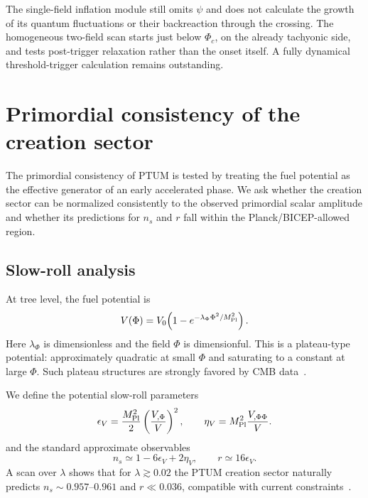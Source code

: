 \documentclass[epj]{svjour}
\begin{document}
The single-field inflation module still omits $\psi$ and does not
calculate the growth of its quantum fluctuations or their backreaction
through the crossing. The homogeneous two-field scan starts just
below $\Phi_c$, on the already tachyonic side, and tests post-trigger
relaxation rather than the onset itself. A fully dynamical
threshold-trigger calculation remains outstanding.

\section{Primordial consistency of the creation sector}
\label{sec:primordial}

The primordial consistency of PTUM is tested by treating the fuel
potential as the effective generator of an early accelerated phase.
We ask whether the creation sector can be normalized consistently
to the observed primordial scalar amplitude and whether its
predictions for \(n_s\) and \(r\) fall within the
Planck/BICEP-allowed region.

\subsection{Slow-roll analysis}

At tree level, the fuel potential is
\begin{equation}
V(\Phi)=V_0\!\left(1-e^{-\lambda_\Phi\Phi^2/M_{\rm Pl}^2}\right).
\label{eq:fuelpot}
\end{equation}
Here \(\lambda_\Phi\) is dimensionless and the field \(\Phi\) is
dimensionful.
This is a plateau-type potential: approximately quadratic at small
\(\Phi\) and saturating to a constant at large \(\Phi\). Such
plateau structures are strongly favored by CMB data~\cite{BICEPKeck2021}.

We define the potential slow-roll parameters
\begin{equation}
\epsilon_V=\frac{M_{\rm Pl}^2}{2}
\left(\frac{V_{,\Phi}}{V}\right)^2,\qquad
\eta_V=M_{\rm Pl}^2\frac{V_{,\Phi\Phi}}{V}.
\end{equation}
and the standard approximate observables
\begin{equation}
n_s\simeq1-6\epsilon_V+2\eta_V,\qquad r\simeq16\epsilon_V.
\end{equation}
A scan over \(\lambda\) shows that for \(\lambda\gtrsim0.02\) the
PTUM creation sector naturally predicts \(n_s\sim0.957\)--\(0.961\)
and \(r\ll0.036\), compatible with current
constraints~\cite{BICEPKeck2021,Planck2018params}.
\end{document}

